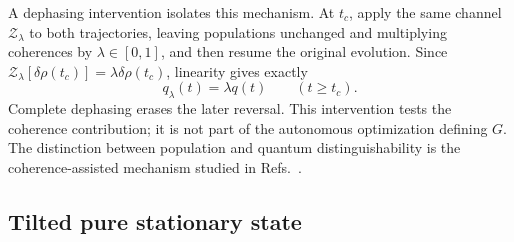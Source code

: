 \documentclass[aps,pra,reprint,amsmath,amssymb,nofootinbib,floatfix,longbibliography]{revtex4-2}
\theoremstyle{aps}
\begin{document}
A dephasing intervention isolates this mechanism. At $t_c$, apply the same channel $\mathcal Z_\lambda$ to both trajectories, leaving populations unchanged and multiplying coherences by $\lambda\in[0,1]$, and then resume the original evolution. Since $\mathcal Z_\lambda[\delta\rho(t_c)]=\lambda\delta\rho(t_c)$, linearity gives exactly
\begin{equation}\label{eq:dephasing-probe}
 q_\lambda(t)=\lambda q(t)\qquad(t\ge t_c).
\end{equation}
Complete dephasing erases the later reversal. This intervention tests the coherence contribution; it is not part of the autonomous optimization defining $G$. The distinction between population and quantum distinguishability is the coherence-assisted mechanism studied in Refs.~\cite{Smirne2019,Benatti2024}.



\subsection{Tilted pure stationary state}
\end{document}
